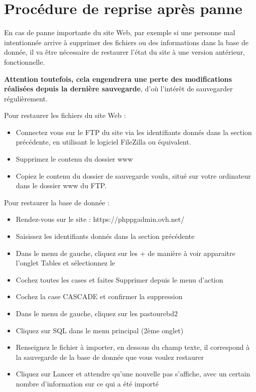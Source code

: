 \documentclass[11pt]{report}
\begin{document}
\section{Procédure de reprise après panne}
En cas de panne importante du site Web, par exemple si une personne mal
intentionnée arrive à supprimer des fichiers ou des informations dans la base de
donnée, il va être nécessaire de restaurer l'état du site à une version
antérieur, fonctionnelle. \\
\par \textbf{Attention toutefois, cela engendrera une perte
des modifications réalisées depuis la dernière sauvegarde}, d'où l'intérêt de
sauvegarder régulièrement. \\

\par Pour restaurer les fichiers du site Web : 
\begin{itemize}
  \item Connectez vous sur le FTP du site via les identifiants donnés dans la
  section précédente, en utilisant le logiciel FileZilla ou équivalent.
  \item Supprimez le contenu du dossier \og www \fg{}
  \item Copiez le contenu du dossier de sauvegarde voulu, situé sur votre
  ordinateur dans le dossier \og www \fg{} du FTP. \\
\end{itemize} 

\par Pour restaurer la base de donnée : 
\begin{itemize}
  \item Rendez-vous sur le site : https://phppgadmin.ovh.net/
  \item Saisissez les identifiants donnés dans la section précédente
  \item Dans le menu de gauche, cliquez sur les \og + \fg{} de manière à voir
  apparaitre l'onglet \og Tables \fg{} et sélectionnez le
  \item Cochez toutes les cases et faites \og Supprimer \fg{} depuis le menu
  d'action
  \item Cochez la case \og CASCADE \fg{} et confirmer la suppression
  \item  Dans le menu de gauche, cliquez sur les \og pastourebd2 \fg{}
  \item Cliquez sur \og SQL \fg{} dans le menu principal (2ème onglet)
  \item Renseignez le fichier à importer, en dessous du champ texte, il
  correspond à la sauvegarde de la base de donnée que vous voulez restaurer
  \item Cliquez sur \og Lancer \fg{} et attendre qu'une nouvelle pas s'affiche,
  avec un certain nombre d'information sur ce qui a été importé \\
\end{itemize}
\end{document}
